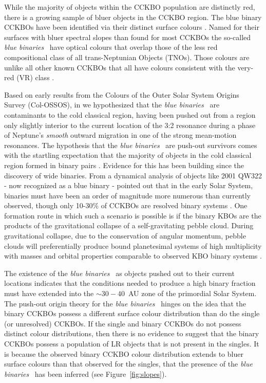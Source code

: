 \documentclass[twocolumn]{aastex63}
\newcommand{\bluebinaries}{{\it blue binaries}}
\begin{document}
While the majority of objects within the CCKBO population are distinctly red, there is a growing sample of bluer objects in the CCKBO region.  The blue binary CCKBOs have been identified via their distinct surface colours \citep{Fraser2017}. Named for their surfaces with bluer spectral slopes than found for most CCKBOs \citep[eg.][]{Gulbis2006, Doressoundiram2007} the so-called \bluebinaries~ have optical colours that overlap those of the less red \citep[LR;][]{Wong2017, Schwamb2019} compositional class of all trans-Neptunian Objects (TNOs). Those colours are unlike all other known CCKBOs that all have colours consistent with the very-red (VR) class \citep{Fraser2012, Peixinho2015}. 

Based on early results from the Colours of the Outer Solar System Origins Survey (Col-OSSOS), in \citet{Fraser2017} we hypothesized that the \bluebinaries~ are contaminants to the cold classical region, having been pushed out from a region only slightly interior to the current location of the 3:2 resonance during a phase of Neptune's \emph {smooth} outward migration in one of the strong mean-motion resonances. The hypothesis that the \bluebinaries~ are push-out survivors comes with the startling expectation that the majority of objects in the cold classical region formed in binary pairs \citep{Fraser2017}. Evidence for this has been building since the discovery of wide binaries. From a dynamical analysis of objects like 2001 QW322 - now recognized as a blue binary - \citet{Petit2004} pointed out that in the early Solar System, binaries must have been an order of magnitude more numerous than currently observed, though only 10-30\% of CCKBOs are resolved binary systems \citep{Noll2020tnss}. One formation route in which such a scenario is possible is if the binary KBOs are the products of the gravitational collapse of a self-gravitating pebble cloud. During gravitational collapse, due to the conservation of angular momentum, pebble clouds will preferentially produce bound planetesimal systems of high multiplicity with masses and orbital properties comparable to observed KBO binary systems \citep{Nesvorny2010, Parker2011,  Nesvorny2019a, Grundy2019, Robinson2020}. 

The existence of the \bluebinaries~ as objects pushed out to their current locations indicates that the conditions needed to produce a high binary fraction must have extended into the $\sim30-40$~AU zone of the primordial Solar System. The push-out origin theory for the \bluebinaries~ hinges on the idea that the binary CCKBOs possess a different surface colour distribution than do the single (or unresolved) CCKBOs. If the single and binary CCKBOs do not possess distinct colour distributions, then there is no evidence to suggest that the binary CCKBOs possess a population of LR objects that is not present in the singles. It is because the observed binary CCKBO colour distribution extends to bluer surface colours than that observed for the singles, that the presence of the \bluebinaries~ has been inferred (see Figure~\ref{fig:slopes}). 
\end{document}
